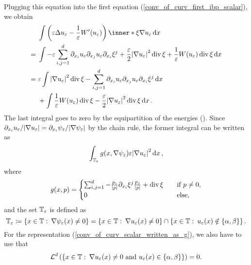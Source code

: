 Plugging this equation into the first equation (\ref{conv_of_curv_first_ibp_scalar}), we obtain
\begin{align}
	& \int
	\left(
	\varepsilon \Delta u_{ \varepsilon }
	-
	\frac{ 1 }{ \varepsilon }
	W'( u_{ \varepsilon } ) 
	\right)
	\inner*{ \xi }{ \nabla u_{ \varepsilon } }
	\dd{ x }
	\notag
	\\
	\label{curvature_term_equality_which_bounds}
	={} &
	\int
	-\varepsilon \sum_{ i, j = 1}^{ d }
	\partial_{ x_{ i } } u_{ \varepsilon }
	\partial_{ x_{ j } } u_{ \varepsilon }
	\partial_{ x_{ i } } \xi^{ j } 
	+
	\frac{ \varepsilon }{ 2 }
	\abs{ \nabla u_{ \varepsilon } }^{ 2 }
	\divg \xi 
	+
	\frac{ 1 }{ \varepsilon }
	W ( u_{ \varepsilon } ) 
	\divg \xi 
	\dd{ x }
	\\
	= {} &
	\varepsilon
	\int
	\abs{ \nabla u_{ \varepsilon } }^{ 2 }
	\divg \xi 
	-
	\sum_{ i, j = 1 }^{ d }
	\partial_{ x_{ i } } u_{ \varepsilon }
	\partial_{ x_{ j } } u_{ \varepsilon }
	\partial_{ x_{ i } } \xi^{ j }
	\dd{ x }
	\notag
	\\
	& + 
	\int
	\frac{ 1 }{ \varepsilon }
	W ( u_{ \varepsilon } )
	\divg \xi 
	-
	\frac{ \varepsilon }{ 2 }
	\abs{ \nabla u_{ \varepsilon } }^{ 2 }
	\divg \xi
	\dd{ x }
	\notag.
\end{align}
The last integral goes to zero by the equipartition of the energies ().
Since $ \partial_{ x_{ i } } u_{ \varepsilon } / \abs{ \nabla u_{ \varepsilon } } = \partial_{ x_{ i } } \psi_{ \varepsilon } / \abs{ \nabla \psi_{ \varepsilon  } } $ by the chain rule, the former integral can be written as
\begin{equation*}
	\label{conv_of_curv_scalar_written_as_g}
	\int_{ \operatorname{\mathbb{T}}_{ \varepsilon } }
	g ( x , \nabla \psi_{ \varepsilon } )
	\varepsilon \abs{ \nabla u_{ \varepsilon } }^{ 2 }
	\dd{ x },
\end{equation*}
where 
\begin{equation*}
	g ( x, p )
	=
	\begin{cases}
		\sum_{ i, j = 1}^{ d }
		-
		\frac{ p_{ i } }{ \abs{ p } }
		\partial_{ x_{ i } } \xi^{ j }
		\frac{ p_{ j } }{ \abs{ p } }
		+
		\operatorname{div} \xi 
		\quad
		&\text{if } p \neq 0,
		\\
		0
		&\text{else},
	\end{cases}
\end{equation*}
and the set $ \operatorname{\mathbb{T}}_{ \varepsilon } $ is defined as
\begin{equation*}
	\operatorname{\mathbb{T}}_{ \varepsilon }
	\coloneqq
	\left\{
	x \in \operatorname{\mathbb{T}}
	\, \colon \,
	\nabla \psi_{ \varepsilon } ( x ) \neq 0
	\right\}
	=
	\left\{
	x \in \operatorname{\mathbb{T}}
	\, \colon \,
	\nabla u_{ \varepsilon } ( x ) \neq 0 
	\right\}
	\cap
	\left\{
	x \in \operatorname{\mathbb{T}}
	\, \colon \,
	u_{ \varepsilon } ( x ) \notin \{ \alpha , \beta \}
	\right\}.
\end{equation*}
For the representation (\ref{conv_of_curv_scalar_written_as_g}), we also have to use that 
\begin{equation*}
	\operatorname{\mathcal{L}}^{ d } \left(
	\left\{
	x \in \operatorname{\mathbb{T}}
	\, \colon \,
	\nabla u_{ \varepsilon } ( x ) \neq 0 \text{ and } u_{ \varepsilon } ( x ) \in \{ \alpha , \beta \}
	\right\}
	\right)
	=
	0.
\end{equation*}

